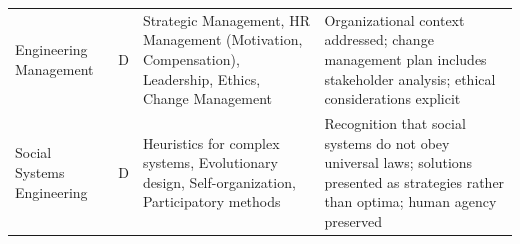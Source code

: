 \begin{table}[h]
\begin{tabular}{@{}p{3.5cm}cp{4cm}p{5cm}@{}}
Engineering Management & D & Strategic Management, HR Management (Motivation, Compensation), Leadership, Ethics, Change Management & Organizational context addressed; change management plan includes stakeholder analysis; ethical considerations explicit \\
\addlinespace

Social Systems Engineering & D & Heuristics for complex systems, Evolutionary design, Self-organization, Participatory methods & Recognition that social systems do not obey universal laws; solutions presented as strategies rather than optima; human agency preserved \\

\bottomrule
\end{tabular}
\end{table}
